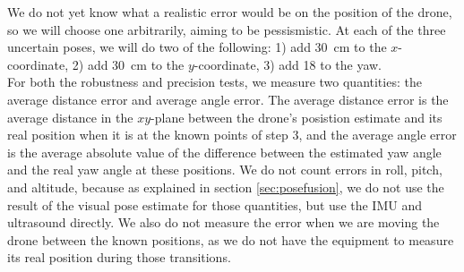 We do not yet know what a realistic error would be on the position of the drone, so we will choose one arbitrarily, aiming to be pessismistic. At each of the three uncertain poses, we will do two of the following: 1) add \SI{30}{\centi\meter} to the $x$-coordinate, 2) add \SI{30}{\centi\meter} to the $y$-coordinate, 3) add \num{18}{\degree} to the yaw.\\
For both the robustness and precision tests, we measure two quantities: the average distance error and average angle error. The average distance error is the average distance in the $xy$-plane between the drone's posistion estimate and its real position when it is at the known points of step 3, and the average angle error is the average absolute value of the difference between the estimated yaw angle and the real yaw angle at these positions. We do not count errors in roll, pitch, and altitude, because as explained in section \ref{sec:posefusion}, we do not use the result of the visual pose estimate for those quantities, but use the IMU and ultrasound directly. We also do not measure the error when we are moving the drone between the known positions, as we do not have the equipment to measure its real position during those transitions.
